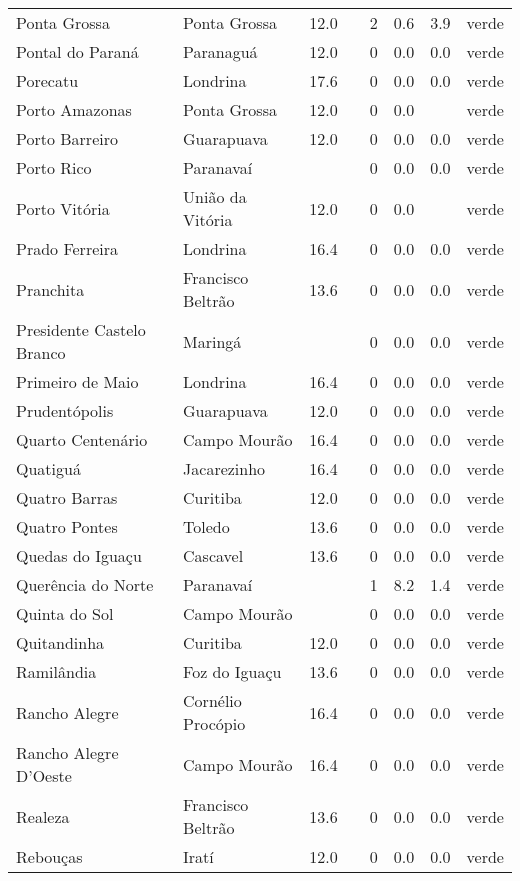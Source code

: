\begin{longtable}{l|lllllll}
  Ponta Grossa & Ponta Grossa & 12.0 &  & 2 & 0.6 & 3.9 & verde \\ 
  Pontal do Paraná & Paranaguá & 12.0 &  & 0 & 0.0 & 0.0 & verde \\ 
  Porecatu & Londrina & 17.6 &  & 0 & 0.0 & 0.0 & verde \\ 
  Porto Amazonas & Ponta Grossa & 12.0 &  & 0 & 0.0 &  & verde \\ 
  Porto Barreiro & Guarapuava & 12.0 &  & 0 & 0.0 & 0.0 & verde \\ 
  Porto Rico & Paranavaí &  &  & 0 & 0.0 & 0.0 & verde \\ 
  Porto Vitória & União da Vitória & 12.0 &  & 0 & 0.0 &  & verde \\ 
  Prado Ferreira & Londrina & 16.4 &  & 0 & 0.0 & 0.0 & verde \\ 
  Pranchita & Francisco Beltrão & 13.6 &  & 0 & 0.0 & 0.0 & verde \\ 
  Presidente Castelo Branco & Maringá &  &  & 0 & 0.0 & 0.0 & verde \\ 
  Primeiro de Maio & Londrina & 16.4 &  & 0 & 0.0 & 0.0 & verde \\ 
  Prudentópolis & Guarapuava & 12.0 &  & 0 & 0.0 & 0.0 & verde \\ 
  Quarto Centenário & Campo Mourão & 16.4 &  & 0 & 0.0 & 0.0 & verde \\ 
  Quatiguá & Jacarezinho & 16.4 &  & 0 & 0.0 & 0.0 & verde \\ 
  Quatro Barras & Curitiba & 12.0 &  & 0 & 0.0 & 0.0 & verde \\ 
  Quatro Pontes & Toledo & 13.6 &  & 0 & 0.0 & 0.0 & verde \\ 
  Quedas do Iguaçu & Cascavel & 13.6 &  & 0 & 0.0 & 0.0 & verde \\ 
  Querência do Norte & Paranavaí &  &  & 1 & 8.2 & 1.4 & verde \\ 
  Quinta do Sol & Campo Mourão &  &  & 0 & 0.0 & 0.0 & verde \\ 
  Quitandinha & Curitiba & 12.0 &  & 0 & 0.0 & 0.0 & verde \\ 
  Ramilândia & Foz do Iguaçu & 13.6 &  & 0 & 0.0 & 0.0 & verde \\ 
  Rancho Alegre & Cornélio Procópio & 16.4 &  & 0 & 0.0 & 0.0 & verde \\ 
  Rancho Alegre D'Oeste & Campo Mourão & 16.4 &  & 0 & 0.0 & 0.0 & verde \\ 
  Realeza & Francisco Beltrão & 13.6 &  & 0 & 0.0 & 0.0 & verde \\ 
  Rebouças & Iratí & 12.0 &  & 0 & 0.0 & 0.0 & verde \\ 

\end{longtable}
